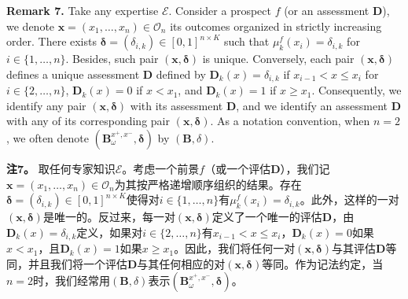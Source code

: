 \documentclass[12pt,a4paper]{article}
\newenvironment{original}
  {\par\noindent\ignorespaces}
  {\par}
\newenvironment{translation}
  {\par\noindent{\color{transblue}\ignorespaces}}
  {\par\medskip}
\begin{document}
\begin{original}
\textbf{Remark 7.} Take any expertise $\mathcal{E}$. Consider a prospect $f$ (or an assessment $\mathbf{D}$), we denote $\mathbf{x} = (x_{1}, \dots, x_{n}) \in \mathcal{O}_{n}$ its outcomes organized in strictly increasing order. There exists $\boldsymbol{\delta} = (\delta_{i,k}) \in [0,1]^{n \times K}$ such that $\mu_{k}^{f}(x_{i}) = \delta_{i,k}$ for $i \in \{1, \dots, n\}$. Besides, such pair $(\mathbf{x}, \boldsymbol{\delta})$ is unique. Conversely, each pair $(\mathbf{x}, \boldsymbol{\delta})$ defines a unique assessment $\mathbf{D}$ defined by $\mathbf{D}_{k}(x) = \delta_{i,k}$ if $x_{i-1} < x \leq x_{i}$ for $i \in \{2, \dots, n\}$, $\mathbf{D}_{k}(x) = 0$ if $x < x_{1}$, and $\mathbf{D}_{k}(x) = 1$ if $x \geq x_{1}$. Consequently, we identify any pair $(\mathbf{x}, \boldsymbol{\delta})$ with its assessment $\mathbf{D}$, and we identify an assessment $\mathbf{D}$ with any of its corresponding pair $(\mathbf{x}, \boldsymbol{\delta})$. As a notation convention, when $n=2$, we often denote $(\mathbf{B}^{x^{+},x^{-}}_{\omega}, \boldsymbol{\delta})$ by $(\mathbf{B}, \delta)$.
\end{original}

\begin{translation}
\textbf{注7。} 取任何专家知识$\mathcal{E}$。考虑一个前景$f$（或一个评估$\mathbf{D}$），我们记$\mathbf{x} = (x_{1}, \dots, x_{n}) \in \mathcal{O}_{n}$为其按严格递增顺序组织的结果。存在$\boldsymbol{\delta} = (\delta_{i,k}) \in [0,1]^{n \times K}$使得对$i \in \{1, \dots, n\}$有$\mu_{k}^{f}(x_{i}) = \delta_{i,k}$。此外，这样的一对$(\mathbf{x}, \boldsymbol{\delta})$是唯一的。反过来，每一对$(\mathbf{x}, \boldsymbol{\delta})$定义了一个唯一的评估$\mathbf{D}$，由$\mathbf{D}_{k}(x) = \delta_{i,k}$定义，如果对$i \in \{2, \dots, n\}$有$x_{i-1} < x \leq x_{i}$，$\mathbf{D}_{k}(x) = 0$如果$x < x_{1}$，且$\mathbf{D}_{k}(x) = 1$如果$x \geq x_{1}$。因此，我们将任何一对$(\mathbf{x}, \boldsymbol{\delta})$与其评估$\mathbf{D}$等同，并且我们将一个评估$\mathbf{D}$与其任何相应的对$(\mathbf{x}, \boldsymbol{\delta})$等同。作为记法约定，当$n=2$时，我们经常用$(\mathbf{B}, \delta)$表示$(\mathbf{B}^{x^{+},x^{-}}_{\omega}, \boldsymbol{\delta})$。
\end{translation}
\end{document}
